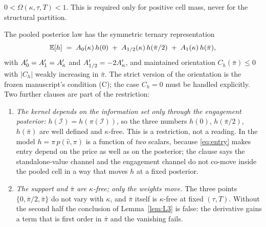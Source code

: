 \begin{assumption}
\label{asm:A8}
$0 < \Omega(\kappa,\tau,T) < 1$. This is required only for positive cell mass, never for the
structural partition.
\end{assumption}

\begin{assumption}
\label{asm:Atau}
The pooled posterior law has the symmetric ternary representation
\begin{equation}
\label{eq:atau}
\mathbb{E}[h] \;=\; A_0(\kappa)\,h(0) \;+\; A_{1/2}(\kappa)\,h(\bar\pi/2) \;+\; A_1(\kappa)\,h(\bar\pi),
\end{equation}
with $A_0' = A_1' = A'_{\kappa}$ and $A_{1/2}' = -2A'_{\kappa}$, and maintained orientation
$C_h(\bar\pi) \le 0$ with $|C_h|$ weakly increasing in $\bar\pi$. The strict version of the
orientation is the frozen manuscript's condition (C\textasteriskcentered); the case $C_h = 0$ must be
handled explicitly. Two further clauses are part of the restriction:
\begin{enumerate}[label=($\tau$-\roman*),leftmargin=3.2em,itemsep=3pt]
\item \emph{The kernel depends on the information set only through the engagement posterior:}
  $h(\mathcal I) = h(\pi(\mathcal I))$, so the three numbers $h(0)$, $h(\bar\pi/2)$, $h(\bar\pi)$ are
  well defined and $\kappa$-free. This is a restriction, not a reading. In the model
  $h = \pi\,p(\hat v,\pi)$ is a function of \emph{two} scalars, because \eqref{eq:entry} makes entry
  depend on the price as well as on the posterior; the clause says the standalone-value channel and
  the engagement channel do not co-move inside the pooled cell in a way that moves $h$ at a fixed
  posterior.
\item \emph{The support and $\bar\pi$ are $\kappa$-free; only the weights move.} The three points
  $\{0,\bar\pi/2,\bar\pi\}$ do not vary with $\kappa$, and $\bar\pi$ itself is $\kappa$-free at fixed
  $(\tau,T)$. Without the second half the conclusion of Lemma~\ref{lem:L3} is false: the derivative
  gains a term that is first order in $\bar\pi$ and the vanishing fails.
\end{enumerate}
\end{assumption}

